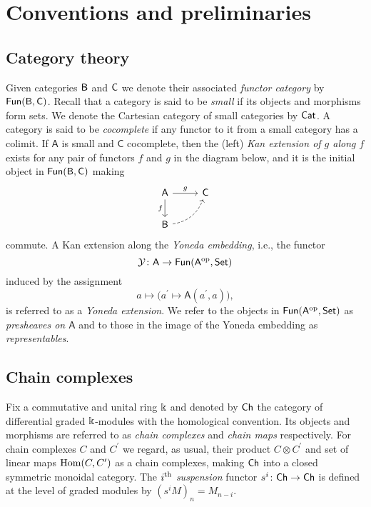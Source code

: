 
\section{Conventions and preliminaries} \label{s:preliminaries}

\subsection{Category theory}

Given categories $\mathsf{B}$ and $\mathsf{C}$ we denote their associated \textit{functor category} by $\mathsf{Fun}(\mathsf{B}, \mathsf{C})$.
Recall that a category is said to be \textit{small} if its objects and morphisms form sets.
We denote the Cartesian category of small categories by $\mathsf{Cat}$.
A category is said to be \textit{cocomplete} if any functor to it from a small category has a colimit.
If $\mathsf{A}$ is small and $\mathsf{C}$ cocomplete, then the (left) \textit{Kan extension of $g$ along $f$} exists for any pair of functors $f$ and $g$ in the diagram below, and it is the initial object in $\mathsf{Fun}(\mathsf{B}, \mathsf{C})$ making
\begin{equation*}
\begin{tikzcd}[column sep=normal, row sep=normal]
\mathsf{A} \arrow[d, "f"'] \arrow[r, "g"] & \mathsf{C} \\
\sB \arrow[dashed, ur, bend right] & \quad
\end{tikzcd}
\end{equation*}
commute.
A Kan extension along the \textit{Yoneda embedding}, i.e., the functor
\[
\mathcal{Y} \colon \mathsf{A} \to \mathsf{Fun}(\mathsf{A}^{\mathrm{op}}, \mathsf{Set})
\]
induced by the assignment
\[
a \mapsto \big( a^\prime \mapsto \mathsf{A}(a^\prime, a) \big),
\]
is referred to as a \textit{Yoneda extension}.
We refer to the objects in $\mathsf{Fun}(\mathsf{A}^{\mathrm{op}}, \mathsf{Set})$ as \textit{presheaves on $\mathsf{A}$} and to those in the image of the Yoneda embedding as \textit{representables}.

\subsection{Chain complexes}

Fix a commutative and unital ring $\Bbbk$ and denoted by $\mathsf{Ch}$ the category of differential graded $\Bbbk$-modules with the homological convention.
Its objects and morphisms are referred to as \textit{chain complexes} and \textit{chain maps} respectively.
For chain complexes $C$ and $C^\prime$ we regard, as usual, their product $C \otimes C^\prime$ and set of linear maps $\mathrm{Hom}(C, C^\prime)$ as a chain complexes, making $\mathsf{Ch}$ into a closed symmetric monoidal category.
The $i^{\mathrm{th}}$ \textit{suspension} functor $s^i \colon \mathsf{Ch} \to \mathsf{Ch}$ is defined at the level of graded modules by $(s^{i}M)_n = M_{n-i}$.

